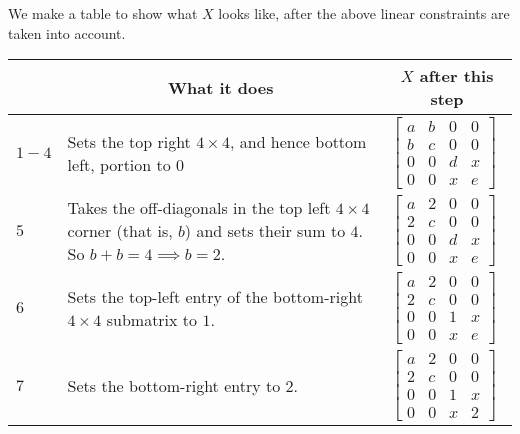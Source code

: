 We make a table to show what $X$ looks like, after the above linear constraints are taken into account.

\begin{table}[]
\begin{tabular}{|l|p{}|l|}
\hline
\rowcolor[HTML]{EFEFEF} 
\multicolumn{1}{|c|}{\cellcolor[HTML]{EFEFEF}\textbf{Step $\#$}} & \multicolumn{1}{c|}{\cellcolor[HTML]{EFEFEF}\textbf{What it does}}                                                              & \multicolumn{1}{c|}{\cellcolor[HTML]{EFEFEF}\textbf{$X$ after this step}} \\ \hline
$1-4$                                                            & Sets the top right $4\times 4$, and hence bottom left, portion to $0$                                                          & $\begin{bmatrix}a&b &0 &0\\b&c&0 &0\\0&0&d&x\\0&0&x&e\end{bmatrix}$       \\ \hline
$5$                                                              & Takes the off-diagonals in the top left $4\times 4$ corner (that is, $b$) and sets their sum to $4$. So $b+b=4\implies b=2$. & $\begin{bmatrix}a&2 &0 &0\\2&c&0 &0\\0&0&d&x\\0&0&x&e\end{bmatrix}$       \\ \hline
$6$                                                              & Sets the top-left entry of the bottom-right $4\times 4$ submatrix to $1$.                                                       & $\begin{bmatrix}a&2 &0 &0\\2&c&0 &0\\0&0&1&x\\0&0&x&e\end{bmatrix}$       \\ \hline
$7$                                                              & Sets the bottom-right entry to $2$.                                                                                             & $\begin{bmatrix}a&2 &0 &0\\2&c&0 &0\\0&0&1&x\\0&0&x&2\end{bmatrix}$       \\ \hline

\end{tabular}
\end{table}
